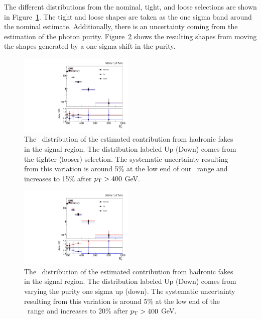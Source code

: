 The different distributions from the nominal, tight, and loose selections are shown in Figure~\ref{fig:hadronFakeShapes}. 
The tight and loose shapes are taken as the one sigma band around the nominal estimate. 
Additionally, there is an uncertainty coming from the estimation of the photon purity. 
Figure~\ref{fig:hadronFakePurity} shows the resulting shapes from moving the shapes generated by a one sigma shift in the purity.

\begin{figure}[htbp]
  \begin{center}
    \includegraphics[width=0.49\textwidth]{Analysis/Figures/hfake/shape_sample.pdf}
    \caption{
      The \pt\ distribution of the estimated contribution from hadronic fakes in the signal region. 
      The distribution labeled Up (Down) comes from the tighter (looser) selection. 
      The systematic uncertainty resulting from this variation is around 5\% at the low end of our \pt\ range and increases to 15\% after $p_{\mathrm{T}} > 400$ GeV.
    }
    \label{fig:hadronFakeShapes}
  \end{center}
\end{figure}

\begin{figure}[htbp]
  \begin{center}
    \includegraphics[width=0.49\textwidth]{Analysis/Figures/hfake/shape_purity.pdf}
    \caption{
      The \pt\ distribution of the estimated contribution from hadronic fakes in the signal region. 
      The distribution labeled Up (Down) comes from varying the purity one sigma up (down). 
      The systematic uncertainty resulting from this variation is around 5\% at the low end of the \pt\ range and increases to 20\% after $p_{\mathrm{T}} > 400$ GeV.
    }
    \label{fig:hadronFakePurity}
  \end{center}
\end{figure}

